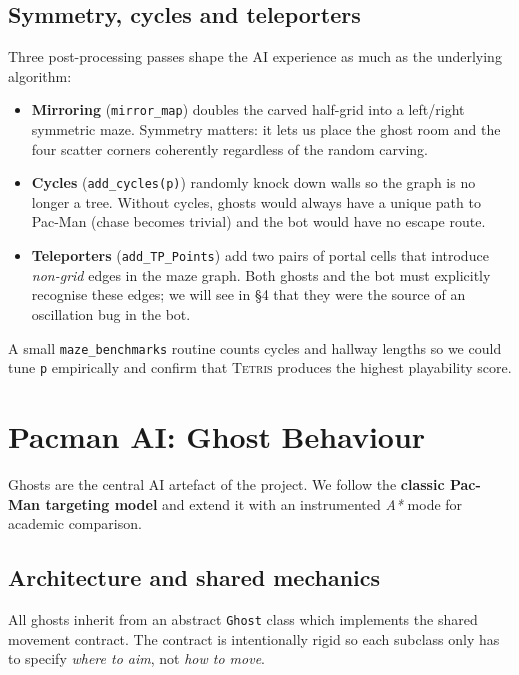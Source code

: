 \documentclass[11pt,a4paper]{article}
\begin{document}
\subsection{Symmetry, cycles and teleporters}

Three post-processing passes shape the AI experience as much as the
underlying algorithm:

\begin{itemize}[leftmargin=1.3em,itemsep=1pt]
  \item \textbf{Mirroring} (\texttt{mirror\_map}) doubles the carved
        half-grid into a left/right symmetric maze. Symmetry matters: it
        lets us place the ghost room and the four scatter corners
        coherently regardless of the random carving.
  \item \textbf{Cycles} (\texttt{add\_cycles(p)}) randomly knock down
        walls so the graph is no longer a tree. Without cycles, ghosts
        would always have a unique path to Pac-Man (chase becomes
        trivial) and the bot would have no escape route.
  \item \textbf{Teleporters} (\texttt{add\_TP\_Points}) add two pairs of
        portal cells that introduce \emph{non-grid} edges in the maze
        graph. Both ghosts and the bot must explicitly recognise these
        edges; we will see in \S4 that they were the source of an
        oscillation bug in the bot.
\end{itemize}

A small \texttt{maze\_benchmarks} routine counts cycles and hallway
lengths so we could tune \texttt{p} empirically and confirm that
\textsc{Tetris} produces the highest playability score.

\section{Pacman AI: Ghost Behaviour}

Ghosts are the central AI artefact of the project. We follow the
\textbf{classic Pac-Man targeting model} \cite{pacmandossier} and extend
it with an instrumented \emph{A*} mode for academic comparison.

\subsection{Architecture and shared mechanics}

All ghosts inherit from an abstract \texttt{Ghost} class which
implements the shared movement contract. The contract is intentionally
rigid so each subclass only has to specify \emph{where to aim}, not
\emph{how to move}.
\end{document}

